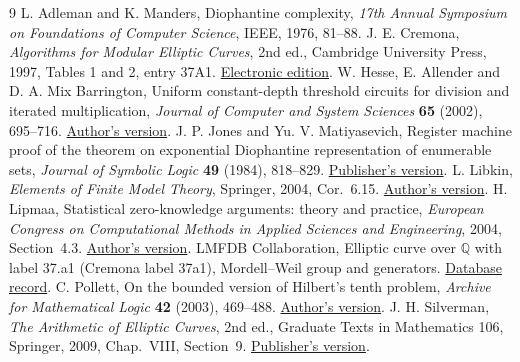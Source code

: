\documentclass[11pt,letterpaper]{article}
\numberwithin{equation}{section}
\begin{document}
\begin{thebibliography}{9}
 L. Adleman and K. Manders, Diophantine complexity, \emph{17th Annual Symposium on Foundations of Computer Science}, IEEE, 1976, 81--88.
 J. E. Cremona, \emph{Algorithms for Modular Elliptic Curves}, 2nd ed., Cambridge University Press, 1997, Tables 1 and 2, entry 37A1. \href{https://wstein.org/edu/Fall2003/252/references/cremona-algs/Cremona-Algorithms_for_modular_elliptic_curves.pdf}{Electronic edition}.
 W. Hesse, E. Allender and D. A. Mix Barrington, Uniform constant-depth threshold circuits for division and iterated multiplication, \emph{Journal of Computer and System Sciences} \textbf{65} (2002), 695--716. \href{https://people.cs.rutgers.edu/~allender/papers/division.pdf}{Author's version}.
 J. P. Jones and Yu. V. Matiyasevich, Register machine proof of the theorem on exponential Diophantine representation of enumerable sets, \emph{Journal of Symbolic Logic} \textbf{49} (1984), 818--829. \href{https://www.cambridge.org/core/journals/journal-of-symbolic-logic/article/abs/register-machine-proof-of-the-theorem-on-exponential-diophantine-representation-of-enumerable-sets/A2A8808B208B10A9D71BF54B6E7DA10E}{Publisher's version}.
 L. Libkin, \emph{Elements of Finite Model Theory}, Springer, 2004, Cor.~6.15. \href{https://www.cs.toronto.edu/~libkin/fmt/fmt.pdf}{Author's version}.
 H. Lipmaa, Statistical zero-knowledge arguments: theory and practice, \emph{European Congress on Computational Methods in Applied Sciences and Engineering}, 2004, Section~4.3. \href{https://kodu.ut.ee/~lipmaa/papers/lip04/eccomas.pdf}{Author's version}.
 LMFDB Collaboration, Elliptic curve over $\mathbb Q$ with label 37.a1 (Cremona label 37a1), Mordell--Weil group and generators. \href{https://www.lmfdb.org/EllipticCurve/Q/37/a/1}{Database record}.
 C. Pollett, On the bounded version of Hilbert's tenth problem, \emph{Archive for Mathematical Logic} \textbf{42} (2003), 469--488. \href{https://www.cs.sjsu.edu/faculty/pollett/papers/hilbert10.pdf}{Author's version}.
 J. H. Silverman, \emph{The Arithmetic of Elliptic Curves}, 2nd ed., Graduate Texts in Mathematics 106, Springer, 2009, Chap.~VIII, Section~9. \href{https://doi.org/10.1007/978-0-387-09494-6}{Publisher's version}.
\end{thebibliography}
\end{document}
